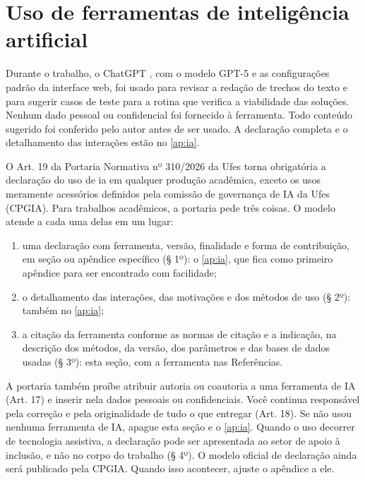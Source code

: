 \section{Uso de ferramentas de inteligência artificial}
\label{sec:metodologia:ia}

Durante o trabalho, o ChatGPT \cite{openai2026chatgpt}, com o modelo GPT-5 e
as configurações padrão da interface web, foi usado para revisar a redação de
trechos do texto e para sugerir casos de teste para a rotina que verifica a
viabilidade das soluções. Nenhum dado pessoal ou confidencial foi fornecido à
ferramenta. Todo conteúdo sugerido foi conferido pelo autor antes de ser usado.
A declaração completa e o detalhamento das interações estão no \cref{ap:ia}.

\begin{instrucao}
O Art. 19 da Portaria Normativa nº 310/2026 da Ufes \cite{ufes2026portaria}
torna obrigatória a declaração do uso de \ac{ia} em qualquer produção
acadêmica, exceto os usos meramente acessórios definidos pela comissão de
governança de IA da Ufes (CPGIA). Para trabalhos acadêmicos, a portaria pede
três coisas. O modelo atende a cada uma delas em um lugar:
\begin{enumerate}
  \item uma declaração com ferramenta, versão, finalidade e forma de
        contribuição, em seção ou apêndice específico (§ 1º): o
        \cref{ap:ia}, que fica como primeiro apêndice para ser encontrado com
        facilidade;
  \item o detalhamento das interações, das motivações e dos métodos de uso
        (§ 2º): também no \cref{ap:ia};
  \item a citação da ferramenta conforme as normas de citação e a indicação,
        na descrição dos métodos, da versão, dos parâmetros e das bases de
        dados usadas (§ 3º): esta seção, com a ferramenta nas Referências.
\end{enumerate}
A portaria também proíbe atribuir autoria ou coautoria a uma ferramenta de IA
(Art. 17) e inserir nela dados pessoais ou confidenciais. Você continua
responsável pela correção e pela originalidade de tudo o que entregar
(Art. 18). Se não usou nenhuma ferramenta de IA, apague esta seção e o
\cref{ap:ia}. Quando o uso decorrer de tecnologia assistiva, a declaração pode
ser apresentada ao setor de apoio à inclusão, e não no corpo do trabalho
(§ 4º). O modelo oficial de declaração ainda será publicado pela CPGIA. Quando
isso acontecer, ajuste o apêndice a ele.
\end{instrucao}
